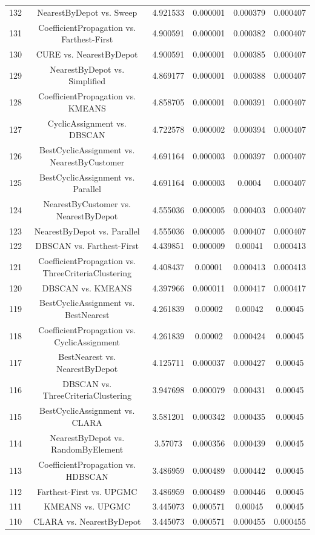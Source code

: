 \documentclass[a4paper,10pt]{article}
\begin{document}
\begin{landscape}
\begin{table}[!htp]
\begin{tabular}{cccccc}
132&NearestByDepot vs. Sweep&4.921533&0.000001&0.000379&0.000407\\
131&CoefficientPropagation vs. Farthest-First&4.900591&0.000001&0.000382&0.000407\\
130&CURE vs. NearestByDepot&4.900591&0.000001&0.000385&0.000407\\
129&NearestByDepot vs. Simplified&4.869177&0.000001&0.000388&0.000407\\
128&CoefficientPropagation vs. KMEANS&4.858705&0.000001&0.000391&0.000407\\
127&CyclicAssignment vs. DBSCAN&4.722578&0.000002&0.000394&0.000407\\
126&BestCyclicAssignment vs. NearestByCustomer&4.691164&0.000003&0.000397&0.000407\\
125&BestCyclicAssignment vs. Parallel&4.691164&0.000003&0.0004&0.000407\\
124&NearestByCustomer vs. NearestByDepot&4.555036&0.000005&0.000403&0.000407\\
123&NearestByDepot vs. Parallel&4.555036&0.000005&0.000407&0.000407\\
122&DBSCAN vs. Farthest-First&4.439851&0.000009&0.00041&0.000413\\
121&CoefficientPropagation vs. ThreeCriteriaClustering&4.408437&0.00001&0.000413&0.000413\\
120&DBSCAN vs. KMEANS&4.397966&0.000011&0.000417&0.000417\\
119&BestCyclicAssignment vs. BestNearest&4.261839&0.00002&0.00042&0.00045\\
118&CoefficientPropagation vs. CyclicAssignment&4.261839&0.00002&0.000424&0.00045\\
117&BestNearest vs. NearestByDepot&4.125711&0.000037&0.000427&0.00045\\
116&DBSCAN vs. ThreeCriteriaClustering&3.947698&0.000079&0.000431&0.00045\\
115&BestCyclicAssignment vs. CLARA&3.581201&0.000342&0.000435&0.00045\\
114&NearestByDepot vs. RandomByElement&3.57073&0.000356&0.000439&0.00045\\
113&CoefficientPropagation vs. HDBSCAN&3.486959&0.000489&0.000442&0.00045\\
112&Farthest-First vs. UPGMC&3.486959&0.000489&0.000446&0.00045\\
111&KMEANS vs. UPGMC&3.445073&0.000571&0.00045&0.00045\\
110&CLARA vs. NearestByDepot&3.445073&0.000571&0.000455&0.000455\\

\end{tabular}
\end{table}
\end{landscape}
\end{document}
